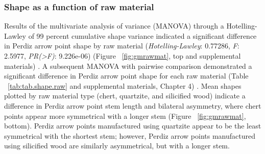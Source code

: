 \documentclass[review]{elsarticle}
\begin{document}
\subsubsection*{Shape as a function of raw material}

Results of the multivariate analysis of variance (MANOVA) through a Hotelling-Lawley of 99 percent cumulative shape variance indicated a significant difference in Perdiz arrow point shape by raw material (\textit{Hotelling-Lawley}: 0.77286, \textit{F}: 2.5977, \textit{PR(>F)}: 9.226e-06) (Figure ~\ref{fig:gmrawmat}, top and supplemental materials) \citep[Chapter 4]{RN8980}. A subsequent MANOVA with pairwise comparison demonstrated a significant difference in Perdiz arrow point shape for each raw material (Table ~\ref{tab:tab.shape.raw} and supplemental materials, Chapter 4) \citep{RN8980}. Mean shapes plotted by raw material type (chert, quartzite, and silicified wood) indicate a difference in Perdiz arrow point stem length and bilateral asymmetry, where chert points appear more symmetrical with a longer stem (Figure ~\ref{fig:gmrawmat}, bottom). Perdiz arrow points manufactured using quartzite appear to be the least symmetrical with the shortest stem; however, Perdiz arrow points manufactured using silicified wood are similarly asymmetrical, but with a longer stem.
\end{document}
